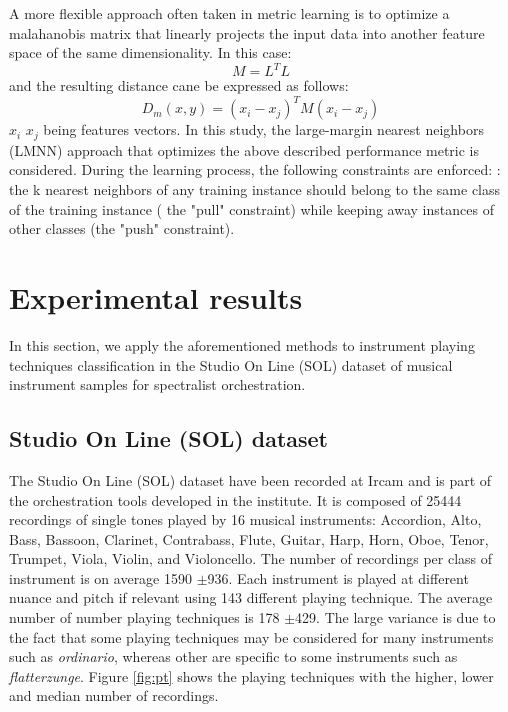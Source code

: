 \documentclass{article}
\begin{document}
A more flexible approach often taken in metric learning \cite{bellet2013survey} is to optimize a malahanobis matrix that linearly projects the input data into another feature space of the same dimensionality. In this case:
\begin{equation}
  M=L^T L
\end{equation}
and the resulting distance cane be expressed as follows:
\begin{equation}
  D_m(x, y) = (x_i-x_j)^T M(x_i-x_j)
\end{equation}
$x_i$ $x_j$ being features vectors. In this study, the large-margin nearest neighbors (LMNN) approach \cite{weinberger2006distance, weinberger2009distance} that optimizes the above described performance metric is considered. During the learning process, the following constraints are enforced: : the
k nearest neighbors of any training instance should belong to the
same class of the training instance ( the "pull" constraint) while keeping away instances of other classes (the "push" constraint).




\section{Experimental results} \label{sec:exp}
In this section, we apply the aforementioned methods to instrument playing techniques classification in the Studio On Line (SOL) dataset of musical instrument samples for spectralist orchestration.

\subsection{Studio On Line (SOL) dataset}

The Studio On Line (SOL) dataset have been recorded at Ircam and is part of the orchestration tools developed in the institute. It is composed of 25444 recordings of single tones played by 16 musical instruments: Accordion, Alto, Bass, Bassoon, Clarinet, Contrabass, Flute, Guitar, Harp, Horn, Oboe, Tenor, Trumpet, Viola, Violin, and Violoncello. The number of recordings per class of instrument is on average 1590 $\pm$936.  Each instrument is played at different nuance and pitch if relevant using 143 different playing technique. The average number of number playing techniques is 178 $\pm$429. The large variance is due to the fact that some playing techniques may be considered for many instruments such as \textit{ordinario}, whereas other are specific to some instruments such as \textit{flatterzunge}. Figure \ref{fig:pt} shows the playing techniques with the higher, lower and median number of recordings.
\end{document}
